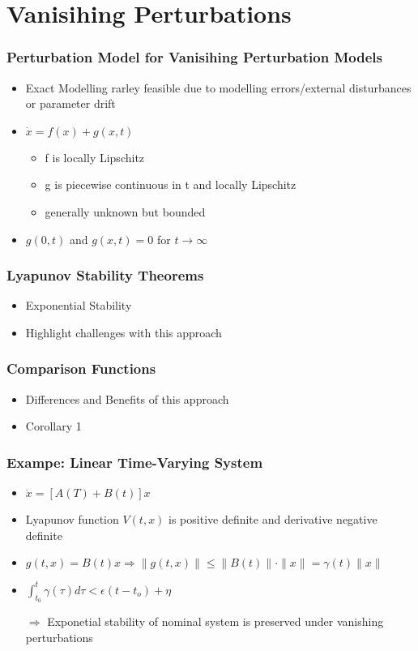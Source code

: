 \documentclass[student, noshadow, lsr, english, aspectratio=169, t]{ITR_LSR_slides}
\begin{document}
\section{Vanisihing Perturbations}
\begin{frame}
	\frametitle{Perturbation Model for Vanisihing Perturbation Models}
	\begin{itemize}
		\item Exact Modelling rarley feasible due to modelling errors/external disturbances or parameter drift
		\item $\dot{x}=f(x)+g(x,t)$
		\begin{itemize}
			\item f is locally Lipschitz
			\item g is piecewise continuous in t and locally Lipschitz
			\item generally unknown but bounded
		\end{itemize}
		\item $g(0,t)$ and $g(x,t)=0$ for $t\rightarrow\infty$
	\end{itemize}
\end{frame}


\begin{frame}
	\frametitle{Lyapunov Stability Theorems}
	\begin{itemize}
		\item Exponential Stability
		\item Highlight challenges with this approach
	\end{itemize}
\end{frame}

\begin{frame}
	\frametitle{Comparison Functions}
	\begin{itemize}
		\item Differences and Benefits of this approach
		\item Corollary 1
	\end{itemize}
\end{frame}

\begin{frame}
	\frametitle{Exampe: Linear Time-Varying System}
	\begin{itemize}
		\item $\dot{x}=[A(T)+B(t)]x$
		\item Lyapunov function $V(t,x)$ is positive definite and derivative negative definite
		\item $g(t,x) = B(t)x \Rightarrow \|g(t,x)\| \leq \|B(t)\| \cdot \|x\| = \gamma(t) \|x\|$
		\item $\int_{t_0}^{t}\gamma(\tau)d\tau<\epsilon(t-t_o)+\eta$
		\item[$\Rightarrow$] Exponetial stability of nominal system is preserved under vanishing perturbations
	\end{itemize}
\end{frame}
\end{document}
